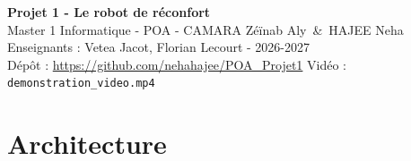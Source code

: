 \documentclass[11pt,a4paper]{article}
\newcommand{\code}[1]{\texttt{#1}}
\begin{document}
\pagestyle{empty}

\begin{center}
  {\Large\bfseries\color{bleu} Projet 1 - Le robot de réconfort}\\[2pt]
  {\small Master 1 Informatique - POA - CAMARA Zéïnab Aly \,\&\, HAJEE Neha \\
  Enseignants : Vetea Jacot, Florian Lecourt - 2026-2027 \\
  Dépôt : \url{https://github.com/nehahajee/POA_Projet1} \quad Vidéo : \code{demonstration\_video.mp4}}
\end{center}
\vspace{-6pt}

\section{Architecture}
\end{document}
